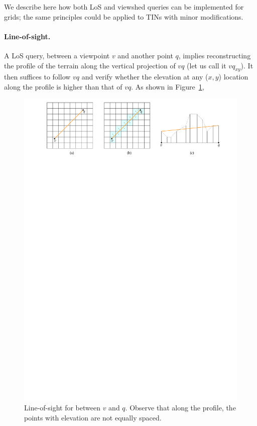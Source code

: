 %

We describe here how both LoS and viewshed queries can be implemented for grids; the same principles could be applied to TINs with minor modifications.


\paragraph{Line-of-sight.}
A LoS query, between a viewpoint $v$ and another point $q$, implies reconstructing the profile of the terrain along the vertical projection of $vq$ (let us call it $vq_{xy}$).
It then suffices to follow $vq$ and verify whether the elevation at any ($x,y$) location along the profile is higher than that of $vq$.
As shown in Figure~\ref{fig:los}, 
\begin{figure}
  \centering
  \includegraphics[width=\linewidth]{figs/los}
  \caption{Line-of-sight for between $v$ and $q$. Observe that along the profile, the points with elevation are not equally spaced.}
\label{fig:los}
\end{figure}
